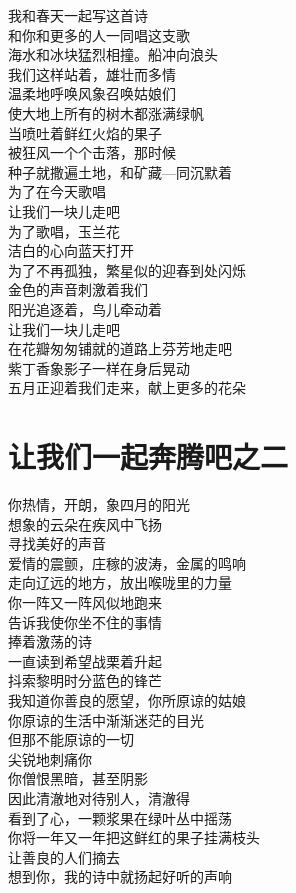 \documentclass[
]{book}
\renewenvironment{quote}{\begin{VF}}{\end{VF}}
\begin{document}
\begin{quote}
我和春天一起写这首诗\\
和你和更多的人一同唱这支歌\\
海水和冰块猛烈相撞。船冲向浪头\\
我们这样站着，雄壮而多情\\
温柔地呼唤风象召唤姑娘们\\
使大地上所有的树木都涨满绿帆\\
当喷吐着鲜红火焰的果子\\
被狂风一个个击落，那时候\\
种子就撒遍土地，和矿藏---同沉默着\\
为了在今天歌唱\\
让我们一块儿走吧\\
为了歌唱，玉兰花\\
洁白的心向蓝天打开\\
为了不再孤独，繁星似的迎春到处闪烁\\
金色的声音刺激着我们\\
阳光追逐着，鸟儿牵动着\\
让我们一块儿走吧\\
在花瓣匆匆铺就的道路上芬芳地走吧\\
紫丁香象影子一样在身后晃动\\
五月正迎着我们走来，献上更多的花朵
\end{quote}

\hypertarget{section-18}{%
\section{让我们一起奔腾吧之二}\label{section-18}}

\begin{quote}
你热情，开朗，象四月的阳光\\
想象的云朵在疾风中飞扬\\
寻找美好的声音\\
爱情的震颤，庄稼的波涛，金属的鸣响\\
走向辽远的地方，放出喉咙里的力量\\
你一阵又一阵风似地跑来\\
告诉我使你坐不住的事情\\
捧着激荡的诗\\
一直读到希望战栗着升起\\
抖索黎明时分蓝色的锋芒\\
我知道你善良的愿望，你所原谅的姑娘\\
你原谅的生活中渐渐迷茫的目光\\
但那不能原谅的一切\\
尖锐地刺痛你\\
你僧恨黑暗，甚至阴影\\
因此清澈地对待别人，清澈得\\
看到了心，一颗浆果在绿叶丛中摇荡\\
你将一年又一年把这鲜红的果子挂满枝头\\
让善良的人们摘去\\
想到你，我的诗中就扬起好听的声响
\end{quote}
\end{document}
